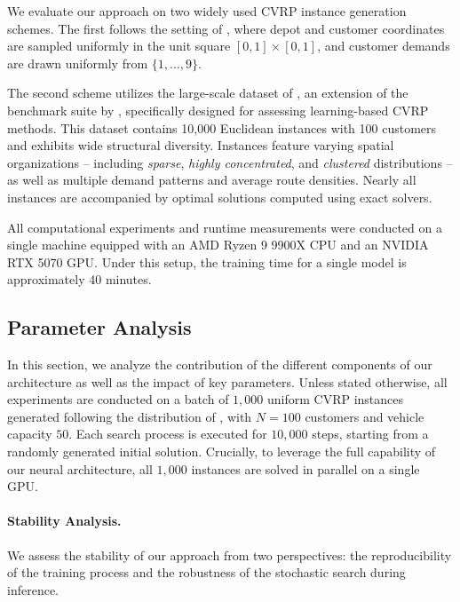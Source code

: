 \documentclass[letterpaper]{article} %
\begin{document}
We evaluate our approach on two widely used CVRP instance generation schemes. The first follows the setting of \cite{nazari_reinforcement_2018}, where depot and customer coordinates are sampled uniformly in the unit square $[0,1]\times[0,1]$, and customer demands are drawn uniformly from $\{1,\ldots,9\}$. 

The second scheme utilizes the large-scale dataset of \cite{queiroga_10000_nodate}, an extension of the benchmark suite by \cite{uchoa_new_2017}, specifically designed for assessing learning-based CVRP methods. This dataset contains 10{,}000 Euclidean instances with 100 customers and exhibits wide structural diversity. Instances feature varying spatial organizations -- including \textit{sparse}, \textit{highly concentrated}, and \textit{clustered} distributions -- as well as multiple demand patterns and average route densities. Nearly all instances are accompanied by optimal solutions computed using exact solvers.

All computational experiments and runtime measurements were conducted on a single machine equipped with an AMD Ryzen 9 9900X CPU and an NVIDIA RTX 5070 GPU. Under this setup, the training time for a single model is approximately 40 minutes. 


\subsection{Parameter Analysis}

In this section, we analyze the contribution of the different components of our architecture as well as the impact of key parameters. Unless stated otherwise, all experiments are conducted on a batch of $1{,}000$ uniform CVRP instances generated following the distribution of \citet{nazari_reinforcement_2018}, with $N = 100$ customers and vehicle capacity $50$. Each search process is executed for $10{,}000$ steps, starting from a randomly generated initial solution. Crucially, to leverage the full capability of our neural architecture, all $1{,}000$ instances are solved in parallel on a single GPU.



\paragraph{Stability Analysis.}
We assess the stability of our approach from two perspectives: the reproducibility of the training process and the robustness of the stochastic search during inference.
\end{document}
